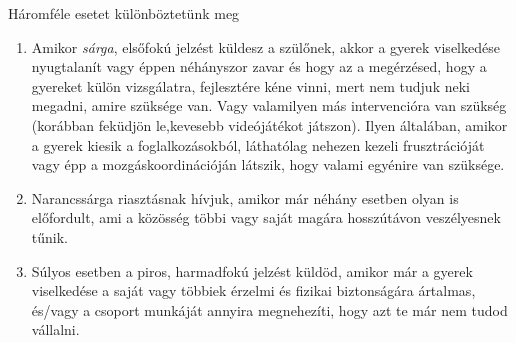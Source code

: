 Háromféle esetet különböztetünk meg

\begin{enumerate}
\def\labelenumi{\arabic{enumi}.}
\item
  Amikor \emph{sárga}, elsőfokú jelzést küldesz a szülőnek, akkor a
  gyerek viselkedése nyugtalanít vagy éppen néhányszor zavar és hogy az
  a megérzésed, hogy a gyereket külön vizsgálatra, fejlesztére kéne
  vinni, mert nem tudjuk neki megadni, amire szüksége van. Vagy
  valamilyen más intervencióra van szükség (korábban feküdjön
  le,kevesebb videójátékot játszon). Ilyen általában, amikor a gyerek
  kiesik a foglalkozásokból, láthatólag nehezen kezeli frusztrációját
  vagy épp a mozgáskoordinációján látszik, hogy valami egyénire van
  szüksége.
\item
  Narancssárga riasztásnak hívjuk, amikor már néhány esetben olyan is
  előfordult, ami a közösség többi vagy saját magára hosszútávon
  veszélyesnek tűnik.
\item
  Súlyos esetben a piros, harmadfokú jelzést küldöd, amikor már a gyerek
  viselkedése a saját vagy többiek érzelmi és fizikai biztonságára
  ártalmas, és/vagy a csoport munkáját annyira megnehezíti, hogy azt te
  már nem tudod vállalni.
\end{enumerate}

